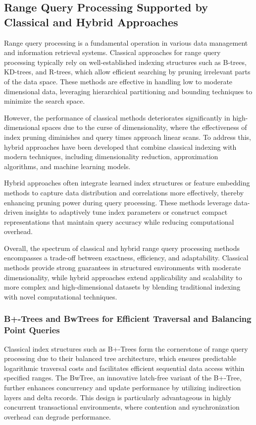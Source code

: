 \documentclass[sigconf]{acmart}
\begin{document}
\subsection{Range Query Processing Supported by Classical and Hybrid Approaches}

Range query processing is a fundamental operation in various data management and information retrieval systems. Classical approaches for range query processing typically rely on well-established indexing structures such as B-trees, KD-trees, and R-trees, which allow efficient searching by pruning irrelevant parts of the data space. These methods are effective in handling low to moderate dimensional data, leveraging hierarchical partitioning and bounding techniques to minimize the search space.

However, the performance of classical methods deteriorates significantly in high-dimensional spaces due to the curse of dimensionality, where the effectiveness of index pruning diminishes and query times approach linear scans. To address this, hybrid approaches have been developed that combine classical indexing with modern techniques, including dimensionality reduction, approximation algorithms, and machine learning models.

Hybrid approaches often integrate learned index structures or feature embedding methods to capture data distribution and correlations more effectively, thereby enhancing pruning power during query processing. These methods leverage data-driven insights to adaptively tune index parameters or construct compact representations that maintain query accuracy while reducing computational overhead.

Overall, the spectrum of classical and hybrid range query processing methods encompasses a trade-off between exactness, efficiency, and adaptability. Classical methods provide strong guarantees in structured environments with moderate dimensionality, while hybrid approaches extend applicability and scalability to more complex and high-dimensional datasets by blending traditional indexing with novel computational techniques.

\subsubsection{B+-Trees and BwTrees for Efficient Traversal and Balancing Point Queries}

Classical index structures such as B+-Trees form the cornerstone of range query processing due to their balanced tree architecture, which ensures predictable logarithmic traversal costs and facilitates efficient sequential data access within specified ranges. The BwTree, an innovative latch-free variant of the B+-Tree, further enhances concurrency and update performance by utilizing indirection layers and delta records. This design is particularly advantageous in highly concurrent transactional environments, where contention and synchronization overhead can degrade performance.
\end{document}

